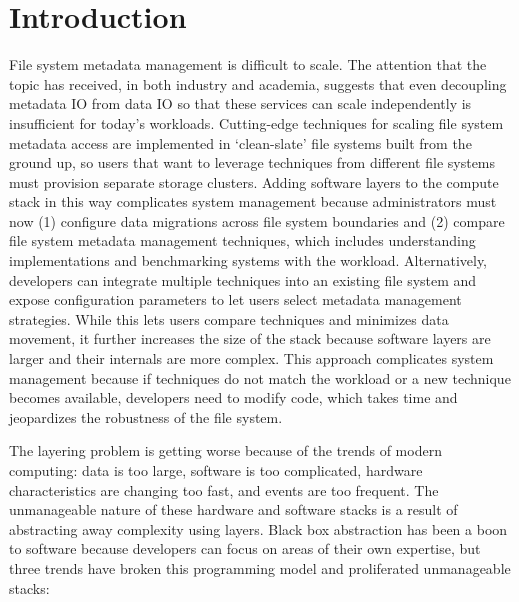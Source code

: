 \chapter{Introduction}

File system metadata management is difficult to scale. The attention that the
topic has received, in both industry and academia, suggests that even decoupling
metadata IO from data IO so that these services can scale independently is
insufficient for today's workloads.  Cutting-edge techniques for scaling file
system metadata access are implemented in `clean-slate' file systems built from
the ground up, so users that want to leverage techniques from different file
systems must provision separate storage clusters. Adding software layers to the
compute stack in this way complicates system management because administrators
must now (1) configure data migrations across file system boundaries and (2)
compare file system metadata management techniques, which includes
understanding implementations and benchmarking systems with the workload.
Alternatively, developers can integrate multiple techniques into an existing
file system and expose configuration parameters to let users select metadata
management strategies. While this lets users compare techniques and minimizes
data movement, it further increases the size of the stack because software
layers are larger and their internals are more complex. This approach
complicates system management because if techniques do not match the workload
or a new technique becomes available, developers need to modify code, which
takes time and jeopardizes the robustness of the file system. 


The layering problem is getting worse because of the trends of modern
computing: data is too large, software is too complicated, hardware
characteristics are changing too fast, and events are too frequent. The
unmanageable nature of these hardware and software stacks is a result of
abstracting away complexity using layers. Black box abstraction has been a boon
to software because developers can focus on areas of their own expertise, but
three trends have broken this programming model and proliferated unmanageable
stacks:

